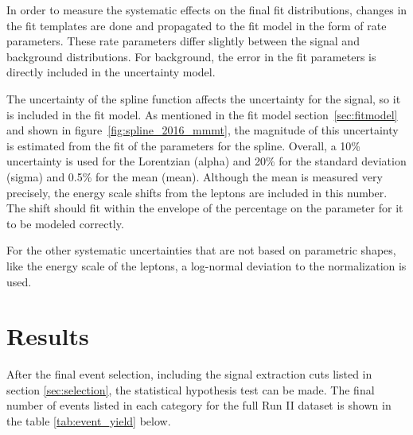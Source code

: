 In order to measure the systematic effects on the final fit distributions, changes in the fit templates are done and propagated to the fit model in the form of rate parameters. These rate parameters differ slightly between the signal and background distributions. 
For background, the error in the fit parameters is directly included in the uncertainty model. 

The uncertainty of the spline function affects the uncertainty for the signal, so it is included in the fit model. 
As mentioned in the fit model section~\ref{sec:fitmodel} and shown in figure~\ref{fig:spline_2016_mmmt}, the magnitude of this uncertainty is estimated from the fit of the parameters for the spline. Overall, a 10\% uncertainty is used for the Lorentzian (alpha) and 20\% for the standard deviation (sigma) and 0.5\% for the mean (mean). Although the mean is measured very precisely, the energy scale shifts from the leptons are included in this number. 
The shift should fit within the envelope of the percentage on the parameter for it to be modeled correctly.


For the other systematic uncertainties that are not based on parametric shapes, like the energy scale of the leptons, a log-normal deviation to the normalization is used. 




\section{Results}
\label{sec:res}
After the final event selection, including the signal extraction cuts listed in section \ref{sec:selection}, the statistical hypothesis test can be made. 
The final number of events listed in each category for the full Run II dataset is shown in the table \ref{tab:event_yield} below.


